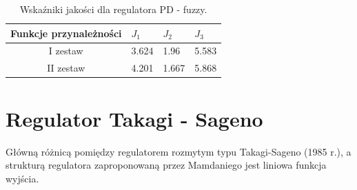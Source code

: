 \begin{table}[h]
	\caption{Wska\'zniki jakości dla regulatora PD - fuzzy.}
	\label{fuzzy_wsk}
	\centering
	
	\begin{tabular}{|c|M{2.5cm}|M{2.5cm}|M{2.5cm}|}
		\hline
		Funkcje przynależności &$J_1$&$J_2$&$J_3$\\
		\hline
		I zestaw &3.624&  1.96 &  5.583\\
		\hline
		II zestaw &4.201&  1.667 &  5.868\\
		\hline
				
	\end{tabular}
\end{table}
\newpage
\section{Regulator Takagi - Sageno}
Główną różnicą pomiędzy regulatorem rozmytym typu Takagi-Sageno (1985 r.), a strukturą regulatora zaproponowaną przez Mamdaniego jest liniowa funkcja wyjścia.  

